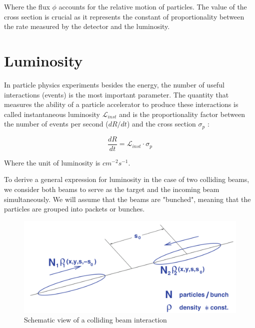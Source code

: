 Where the flux $\phi$ accounts for the relative motion of particles.
The value of the cross section is crucial as it represents the constant of proportionality between the rate measured by the detector and the luminosity.

\section{Luminosity }

In particle physics experiments besides the energy, the number of useful interactions (events) is the most important parameter. The quantity that measures the ability of a particle accelerator to produce these interactions is called instantaneous luminosity $\mathcal{L}_{inst}$ and is the proportionality factor between the number of events per second ($dR/dt$) and the cross section $\sigma_{p}$ \cite{concept_of_luminosity}: 

\begin{equation}
\frac{dR}{dt}=\mathcal{L}_{inst} \cdot \sigma_{p}
\end{equation}

Where the unit of luminosity is $cm^{-2}s^{-1}$. 

To derive a general expression for luminosity in the case of two colliding beams, we consider both beams to serve as the target and the incoming beam simultaneously. We will assume that the beams are "bunched", meaning that the particles are grouped into packets or bunches. 

\begin{center}
  \begin{figure}[h!]
    \centering
\includegraphics[scale=.25]{Chapter1/luminosity.png} 
 \caption[Colliding beam interaction]{Schematic view of a colliding beam interaction\cite{concept_of_luminosity}}
    \label{luminosity}
  \end{figure}
\end{center}

